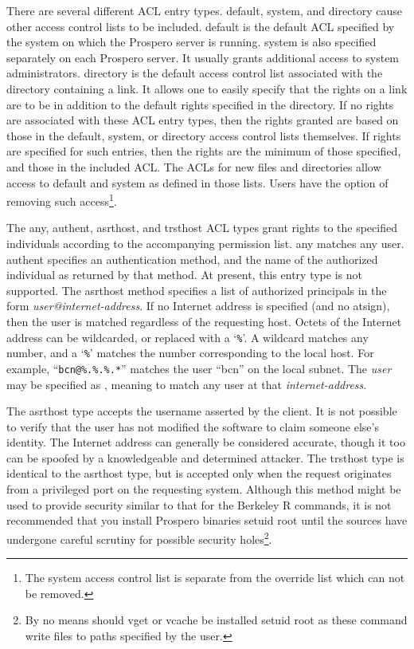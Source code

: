 There are several different ACL entry types.  {\sc default}, {\sc
system}, and {\sc directory} cause other access control lists to be
included.  {\sc default} is the default ACL specified by the system on
which the Prospero server is running.  {\sc system} is also specified
separately on each Prospero server.  It usually grants additional
access to system administrators.  {\sc directory} is the default
access control list associated with the directory containing a link.
It allows one to easily specify that the rights on a link are to be in
addition to the default rights specified in the directory.  If no
rights are associated with these ACL entry types, then the rights
granted are based on those in the {\sc default}, {\sc system}, or {\sc
directory} access control lists themselves.  If rights are specified
for such entries, then the rights are the minimum of those specified,
and those in the included ACL.  The ACLs for new files and directories
allow access to {\sc default} and {\sc system} as defined in those
lists.  Users have the option of removing such access\footnote{The
{\sc system} access control list is separate from the {\sc override}
list which can not be removed.}.

The {\sc any}, {\sc authent}, {\sc asrthost}, and {\sc trsthost} ACL
types grant rights to the specified individuals according to the
accompanying permission list.  {\sc any} matches any user.  {\sc
authent} specifies an authentication method, and the name of the
authorized individual as returned by that method.  At present, this
entry type is not supported.  The {\sc asrthost} method specifies a
list of authorized principals in the form {\em user@internet-address}.
If no Internet address is specified (and no atsign), then the user is
matched regardless of the requesting host.  Octets of the Internet
address can be wildcarded, or replaced with a `{\tt \%}'.  A wildcard
matches any number, and a `{\tt \%}' matches the number corresponding to the
local host.  For example, ``{\tt bcn@\%.\%.\%.*}'' matches the user ``bcn''
on the local subnet.  The {\em user} may be specified as {\tt *},
meaning to match any user at that {\em internet-address}.

The {\sc asrthost} type accepts the username asserted by the client.
It is not possible to verify that the user has not modified the
software to claim someone else's identity.  The Internet address can
generally be considered accurate, though it too can be spoofed by a
knowledgeable and determined attacker.  The {\sc trsthost} type is
identical to the {\sc asrthost} type, but is accepted only when the
request originates from a privileged port on the requesting system.
Although this method might be used to provide security similar to that
for the Berkeley R commands, it is not recommended that you install
Prospero binaries setuid root until the sources have undergone careful
scrutiny for possible security holes\footnote{By no means should vget
or vcache be installed setuid root as these command write files to
paths specified by the user.}.


